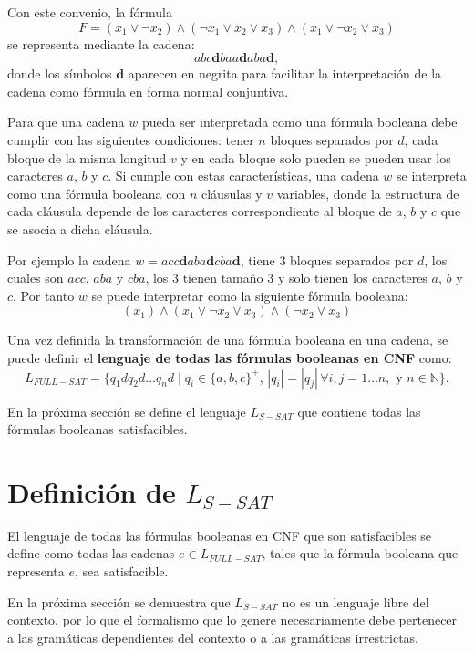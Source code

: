 Con este convenio, la fórmula
$$ F=(x_1 \vee \neg x_2) \wedge (\neg x_1 \vee x_2 \vee x_3) \wedge (x_1 \vee \neg x_2 \vee x_3)$$
se representa mediante la cadena:
$$abc\mathbf{d}baa\mathbf{d}aba\mathbf{d},$$
donde los símbolos $\mathbf{d}$ aparecen en negrita para facilitar la interpretación de la cadena como fórmula 
en forma normal conjuntiva.

Para que una cadena $w$ pueda ser interpretada como una fórmula booleana debe cumplir con las siguientes condiciones:
tener $n$ bloques separados por $d$, cada bloque de la misma longitud $v$ y en cada bloque solo pueden se pueden usar los caracteres
$a$, $b$ y $c$.  Si cumple con estas características, una cadena $w$ se interpreta como una fórmula booleana con $n$ cláusulas y $v$ variables, donde la estructura de cada cláusula depende de los caracteres correspondiente al bloque de $a$, $b$ y $c$ que se asocia a dicha cláusula.

Por ejemplo la cadena $w=acc\mathbf{d}aba\mathbf{d}cba\mathbf{d}$, tiene 3 bloques separados por $d$, los cuales son $acc$, $aba$ y $cba$, los 3 tienen tamaño 3 y solo tienen los caracteres $a$, $b$ y $c$.
Por tanto  $w$ se puede interpretar como la siguiente fórmula booleana:
$$(x_1)\wedge(x_1\vee \neg x_2 \vee x_3) \wedge (\neg x_2\vee x_3)$$

\begin{definition}
    Una vez definida la transformación de una fórmula booleana en una cadena, se puede definir el \textbf{lenguaje de todas las fórmulas booleanas en CNF} como:
    \[
        L_{FULL-SAT} = \{ q_1dq_2d\dots q_nd \mid q_i \in \{a, b,c\}^+\text{, }
        |q_i| = |q_j| \, \forall i, j =1\dots n, \text{ y } n\in \mathbb{N}\}.
    \]
\end{definition}

En la próxima sección se define el lenguaje $L_{S-SAT}$ que contiene todas las fórmulas booleanas satisfacibles.

\section{Definición de $L_{S-SAT}$}

\begin{definition}
    El lenguaje de todas las fórmulas booleanas en CNF que son satisfacibles se define como todas las cadenas $e\in L_{FULL-SAT}$,
    tales que la fórmula booleana que representa $e$, sea satisfacible.
\end{definition}


En la próxima sección se demuestra que $L_{S-SAT}$ no es un lenguaje libre del contexto, por lo que el formalismo que lo
genere necesariamente debe pertenecer a las gramáticas dependientes del contexto o a las gramáticas irrestrictas.

